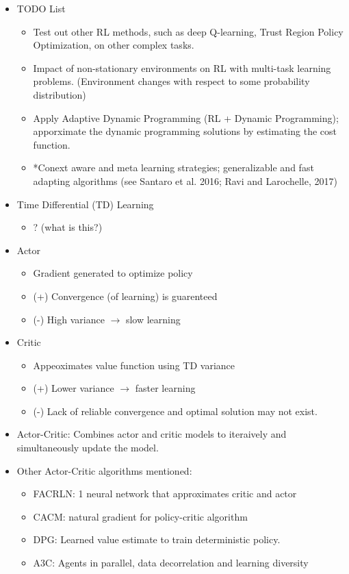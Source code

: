 \documentclass{article}
\begin{document}
\begin{itemize}
	\item TODO List
	
	\begin{itemize}
		\item Test out other RL methods, such as deep Q-learning, Trust Region Policy Optimization, on other complex tasks.
		\item Impact of non-stationary environments on RL with multi-task learning problems. (Environment changes with respect to some probability distribution)
		\item Apply Adaptive Dynamic Programming (RL + Dynamic Programming); apporximate the dynamic programming solutions by estimating the cost function. 
		\item *Conext aware and meta learning strategies; generalizable and fast adapting algorithms (see Santaro et al. 2016; Ravi and Larochelle, 2017)
	\end{itemize}
	
	\item Time Differential (TD) Learning
	\begin{itemize}
		\item ? (what is this?)
	\end{itemize}
	
	\item Actor
	\begin{itemize}
		\item Gradient generated to optimize policy
		\item (+) Convergence (of learning) is guarenteed
		\item (-) High variance $\rightarrow$ slow learning 
	\end{itemize}
	
	\item Critic
	\begin{itemize}
		\item Appeoximates value function using TD variance
		\item (+) Lower variance $\rightarrow$ faster learning
		\item (-) Lack of reliable convergence and optimal solution may not exist.
	\end{itemize}
	
	\item Actor-Critic: Combines actor and critic models to iteraively and simultaneously update the model.
	
	\item Other Actor-Critic algorithms mentioned:
	\begin{itemize}
		\item FACRLN: 1 neural network that approximates critic and actor
		\item CACM: natural gradient for policy-critic algorithm
		\item DPG: Learned value estimate to train deterministic policy.
		\item A3C: Agents in parallel, data decorrelation and learning diversity
	\end{itemize}
	

\end{itemize}
\end{document}
